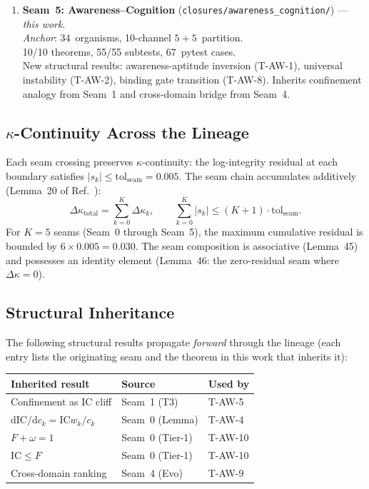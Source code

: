 \documentclass[
  aps,
  prd,
  twocolumn,
  superscriptaddress,
  nofootinbib,
  floatfix
]{revtex4-2}
\newcommand{\dd}{\mathrm{d}}
\newcommand{\beq}{\begin{equation}}
\newcommand{\eeq}{\end{equation}}
\newcommand{\IC}{\mathrm{IC}}
\begin{document}
\begin{enumerate}
\item \textbf{Seam~5: Awareness--Cognition}
  (\texttt{closures/awareness\_cognition/}) ---
  \emph{this work}.\\
  \emph{Anchor}: 34~organisms, 10-channel
  $5\!+\!5$~partition.\\
  10/10 theorems, 55/55 subtests, 67~pytest cases.\\
  New structural results: awareness-aptitude inversion
  (T-AW-1), universal instability (T-AW-2), binding
  gate transition (T-AW-8).  Inherits confinement
  analogy from Seam~1 and cross-domain bridge from
  Seam~4.
\end{enumerate}

\subsection{$\kappa$-Continuity Across the Lineage}

Each seam crossing preserves $\kappa$-continuity: the
log-integrity residual at each boundary satisfies
$|s_k| \leq \mathrm{tol}_{\mathrm{seam}} = 0.005$.
The seam chain accumulates additively (Lemma~20 of
Ref.~\cite{paulus2025umcp}):
\beq\label{eq:seam_compose}
  \Delta\kappa_{\mathrm{total}}
  = \sum_{k=0}^{K} \Delta\kappa_k, \qquad
  \sum_{k=0}^{K} |s_k| \leq (K+1) \cdot
    \mathrm{tol}_{\mathrm{seam}}.
\eeq
For $K = 5$ seams (Seam~0 through Seam~5), the maximum
cumulative residual is bounded by
$6 \times 0.005 = 0.030$.  The seam composition is
associative (Lemma~45) and possesses an identity element
(Lemma~46: the zero-residual seam where
$\Delta\kappa = 0$).

\subsection{Structural Inheritance}

The following structural results propagate \emph{forward}
through the lineage (each entry lists the originating seam
and the theorem in this work that inherits it):

\begin{center}
\small
\begin{tabular}{lll}
\toprule
Inherited result & Source & Used by \\
\midrule
Confinement as IC cliff & Seam~1 (T3) & T-AW-5 \\
$\dd\IC/\dd c_k = \IC w_k/c_k$ & Seam~0 (Lemma) &
  T-AW-4 \\
$F + \omega = 1$ & Seam~0 (Tier-1) & T-AW-10 \\
$\IC \leq F$ & Seam~0 (Tier-1) & T-AW-10 \\
Cross-domain ranking & Seam~4 (Evo) & T-AW-9 \\
\bottomrule
\end{tabular}
\end{center}
\end{document}
